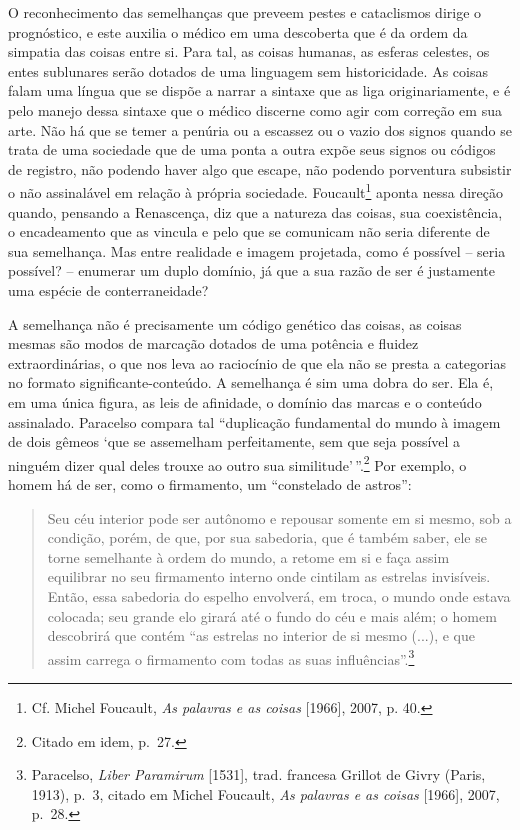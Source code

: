 O reconhecimento das semelhanças que preveem pestes e cataclismos dirige
o prognóstico, e este auxilia o médico em uma descoberta que é da ordem
da simpatia das coisas entre si. Para tal, as coisas humanas, as esferas
celestes, os entes sublunares serão dotados de uma linguagem sem
historicidade. As coisas falam uma língua que se dispõe a narrar a
sintaxe que as liga originariamente, e é pelo manejo dessa sintaxe que o
médico discerne como agir com correção em sua arte. Não há que se temer
a penúria ou a escassez ou o vazio dos signos quando se trata de uma
sociedade que de uma ponta a outra expõe seus signos ou códigos de
registro, não podendo haver algo que escape, não podendo porventura
subsistir o não assinalável em relação à própria sociedade.
Foucault\footnote{Cf. Michel Foucault, \emph{As palavras e as coisas}
  {[}1966{]}, 2007, p. 40.} aponta nessa direção quando, pensando a
Renascença, diz que a natureza das coisas, sua coexistência, o
encadeamento que as vincula e pelo que se comunicam não seria diferente
de sua semelhança. Mas entre realidade e imagem projetada, como é
possível -- seria possível? -- enumerar um duplo domínio, já que a sua
razão de ser é justamente uma espécie de conterraneidade?

A semelhança não é precisamente um código genético das coisas, as coisas
mesmas são modos de marcação dotados de uma potência e fluidez
extraordinárias, o que nos leva ao raciocínio de que ela não se presta a
categorias no formato significante-conteúdo. A semelhança é sim uma
dobra do ser. Ela é, em uma única figura, as leis de afinidade, o
domínio das marcas e o conteúdo assinalado. Paracelso compara tal
``duplicação fundamental do mundo à imagem de dois gêmeos `que se
assemelham perfeitamente, sem que seja possível a ninguém dizer qual
deles trouxe ao outro sua similitude'\,''.\footnote{Citado em idem,
  p.~27.} Por exemplo, o homem há de ser, como o firmamento, um
``constelado de astros'':

\begin{quote}
Seu céu interior pode ser autônomo e repousar somente em si mesmo, sob a
condição, porém, de que, por sua sabedoria, que é também saber, ele se
torne semelhante à ordem do mundo, a retome em si e faça assim
equilibrar no seu firmamento interno onde cintilam as estrelas
invisíveis. Então, essa sabedoria do espelho envolverá, em troca, o
mundo onde estava colocada; seu grande elo girará até o fundo do céu e
mais além; o homem descobrirá que contém ``as estrelas no interior de si
mesmo (...), e que assim carrega o firmamento com todas as suas
influências''.\footnote{Paracelso, \emph{Liber Paramirum} {[}1531{]},
  trad. francesa Grillot de Givry (Paris, 1913), p.~3, citado em Michel
  Foucault, \emph{As palavras e as coisas} {[}1966{]}, 2007, p.~28.}
\end{quote}

